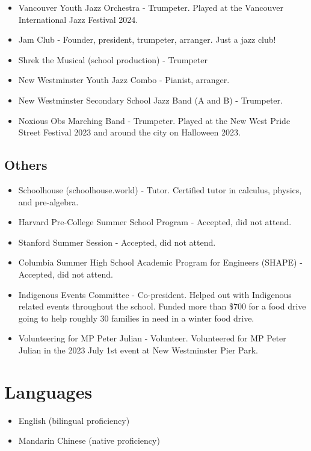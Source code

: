\documentclass{article}
\begin{document}
\begin{itemize}
	\item Vancouver Youth Jazz Orchestra - Trumpeter. Played at the Vancouver International Jazz Festival 2024.
	\item Jam Club - Founder, president, trumpeter, arranger. Just a jazz club!
	\item Shrek the Musical (school production) - Trumpeter
	\item New Westminster Youth Jazz Combo - Pianist, arranger.
	\item New Westminster Secondary School Jazz Band (A and B) - Trumpeter.
	\item Noxious Obs Marching Band - Trumpeter. Played at the New West Pride Street Festival 2023 and around the city on Halloween 2023.
\end{itemize}

\subsection*{Others}
\begin{itemize}
	\item Schoolhouse (schoolhouse.world) - Tutor. Certified tutor in calculus, physics, and pre-algebra.
	\item Harvard Pre-College Summer School Program - Accepted, did not attend.
	\item Stanford Summer Session - Accepted, did not attend.
	\item Columbia Summer High School Academic Program for Engineers (SHAPE) - Accepted, did not attend.
	\item Indigenous Events Committee - Co-president. Helped out with Indigenous related events throughout the school. Funded more than \$700 for a food drive going to help roughly 30 families in need in a winter food drive.
	\item Volunteering for MP Peter Julian - Volunteer. Volunteered for MP Peter Julian in the 2023 July 1st event at New Westminster Pier Park.
\end{itemize}

\section*{Languages}

\begin{itemize}
	\item English (bilingual proficiency)
	\item Mandarin Chinese (native proficiency)
\end{itemize}
\end{document}
